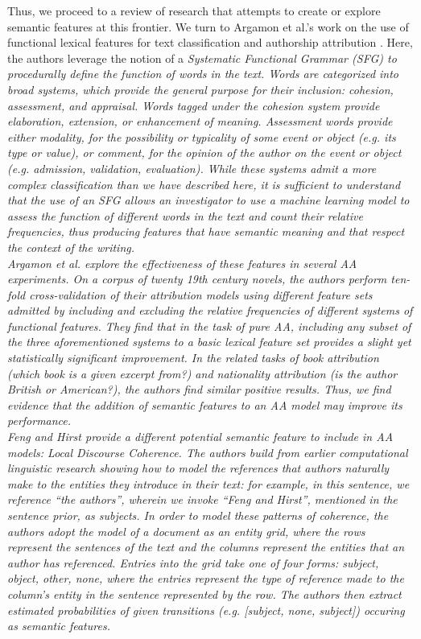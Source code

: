 \documentclass[11pt,a4paper]{article}
\begin{document}
Thus, we proceed to a review of research that attempts to create or explore semantic features at this frontier. We turn to Argamon et al.'s work on the use of functional lexical features for text classification and authorship attribution \citeyearpar{Argamon2007}. Here, the authors leverage the notion of a \em Systematic Functional Grammar \em (SFG) to procedurally define the function of words in the text. Words are categorized into broad \em systems, \em which provide the general purpose for their inclusion: cohesion, assessment, and appraisal. Words tagged under the cohesion system provide elaboration, extension, or enhancement of meaning. Assessment words provide either modality, for the possibility or typicality of some event or object (e.g. its type or value), or comment, for the opinion of the author on the event or object (e.g. admission, validation, evaluation). While these systems admit a more complex classification than we have described here, it is sufficient to understand that the use of an SFG allows an investigator to use a machine learning model to assess the function of different words in the text and count their relative frequencies, thus producing features that have semantic meaning and that respect the context of the writing. \\
Argamon et al. explore the effectiveness of these features in several AA experiments. On a corpus of twenty 19th century novels, the authors perform ten-fold cross-validation of their attribution models using different feature sets admitted by including and excluding the relative frequencies of different systems of functional features. They find that in the task of pure AA, including any subset of the three aforementioned systems to a basic lexical feature set provides a slight yet statistically significant improvement. In the related tasks of book attribution (which book is a given excerpt from?) and nationality attribution (is the author British or American?), the authors find similar positive results. Thus, we find evidence that the addition of semantic features to an AA model may improve its performance. \\
Feng and Hirst \citeyearpar{Hirst2013} provide a different potential semantic feature to include in AA models: \em Local Discourse Coherence. \em The authors build from earlier computational linguistic research showing how to model the references that authors naturally make to the entities they introduce in their text: for example, in this sentence, we reference ``the authors'', wherein we invoke ``Feng and Hirst'', mentioned in the sentence prior, as subjects. In order to model these patterns of coherence, the authors adopt the model of a document as an entity grid, where the rows represent the sentences of the text and the columns represent the entities that an author has referenced. Entries into the grid take one of four forms: \em subject, object, other, none, \em where the entries represent the type of reference made to the column's entity in the sentence represented by the row. The authors then extract estimated probabilities of given transitions (e.g. \em [subject, none, subject]\em) occuring as semantic features. \\
\end{document}
